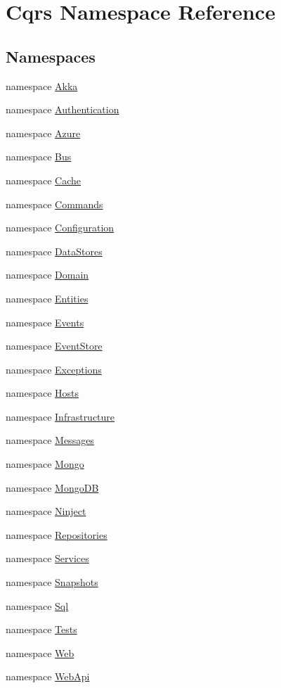 \hypertarget{namespaceCqrs}{}\section{Cqrs Namespace Reference}
\label{namespaceCqrs}
\subsection*{Namespaces}
\begin{DoxyCompactItemize}
\item 
namespace \hyperlink{namespaceCqrs_1_1Akka}{Akka}
\item 
namespace \hyperlink{namespaceCqrs_1_1Authentication}{Authentication}
\item 
namespace \hyperlink{namespaceCqrs_1_1Azure}{Azure}
\item 
namespace \hyperlink{namespaceCqrs_1_1Bus}{Bus}
\item 
namespace \hyperlink{namespaceCqrs_1_1Cache}{Cache}
\item 
namespace \hyperlink{namespaceCqrs_1_1Commands}{Commands}
\item 
namespace \hyperlink{namespaceCqrs_1_1Configuration}{Configuration}
\item 
namespace \hyperlink{namespaceCqrs_1_1DataStores}{Data\+Stores}
\item 
namespace \hyperlink{namespaceCqrs_1_1Domain}{Domain}
\item 
namespace \hyperlink{namespaceCqrs_1_1Entities}{Entities}
\item 
namespace \hyperlink{namespaceCqrs_1_1Events}{Events}
\item 
namespace \hyperlink{namespaceCqrs_1_1EventStore}{Event\+Store}
\item 
namespace \hyperlink{namespaceCqrs_1_1Exceptions}{Exceptions}
\item 
namespace \hyperlink{namespaceCqrs_1_1Hosts}{Hosts}
\item 
namespace \hyperlink{namespaceCqrs_1_1Infrastructure}{Infrastructure}
\item 
namespace \hyperlink{namespaceCqrs_1_1Messages}{Messages}
\item 
namespace \hyperlink{namespaceCqrs_1_1Mongo}{Mongo}
\item 
namespace \hyperlink{namespaceCqrs_1_1MongoDB}{Mongo\+DB}
\item 
namespace \hyperlink{namespaceCqrs_1_1Ninject}{Ninject}
\item 
namespace \hyperlink{namespaceCqrs_1_1Repositories}{Repositories}
\item 
namespace \hyperlink{namespaceCqrs_1_1Services}{Services}
\item 
namespace \hyperlink{namespaceCqrs_1_1Snapshots}{Snapshots}
\item 
namespace \hyperlink{namespaceCqrs_1_1Sql}{Sql}
\item 
namespace \hyperlink{namespaceCqrs_1_1Tests}{Tests}
\item 
namespace \hyperlink{namespaceCqrs_1_1Web}{Web}
\item 
namespace \hyperlink{namespaceCqrs_1_1WebApi}{Web\+Api}
\end{DoxyCompactItemize}
